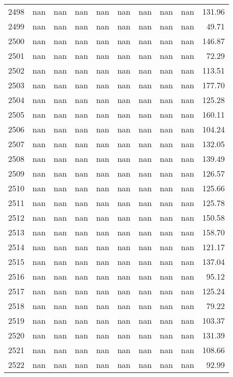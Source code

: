 \begin{tabular}{lrrrrrrrrr}
2498 & nan & nan & nan & nan & nan & nan & nan & nan & 131.96 \\
2499 & nan & nan & nan & nan & nan & nan & nan & nan & 49.71 \\
2500 & nan & nan & nan & nan & nan & nan & nan & nan & 146.87 \\
2501 & nan & nan & nan & nan & nan & nan & nan & nan & 72.29 \\
2502 & nan & nan & nan & nan & nan & nan & nan & nan & 113.51 \\
2503 & nan & nan & nan & nan & nan & nan & nan & nan & 177.70 \\
2504 & nan & nan & nan & nan & nan & nan & nan & nan & 125.28 \\
2505 & nan & nan & nan & nan & nan & nan & nan & nan & 160.11 \\
2506 & nan & nan & nan & nan & nan & nan & nan & nan & 104.24 \\
2507 & nan & nan & nan & nan & nan & nan & nan & nan & 132.05 \\
2508 & nan & nan & nan & nan & nan & nan & nan & nan & 139.49 \\
2509 & nan & nan & nan & nan & nan & nan & nan & nan & 126.57 \\
2510 & nan & nan & nan & nan & nan & nan & nan & nan & 125.66 \\
2511 & nan & nan & nan & nan & nan & nan & nan & nan & 125.78 \\
2512 & nan & nan & nan & nan & nan & nan & nan & nan & 150.58 \\
2513 & nan & nan & nan & nan & nan & nan & nan & nan & 158.70 \\
2514 & nan & nan & nan & nan & nan & nan & nan & nan & 121.17 \\
2515 & nan & nan & nan & nan & nan & nan & nan & nan & 137.04 \\
2516 & nan & nan & nan & nan & nan & nan & nan & nan & 95.12 \\
2517 & nan & nan & nan & nan & nan & nan & nan & nan & 125.24 \\
2518 & nan & nan & nan & nan & nan & nan & nan & nan & 79.22 \\
2519 & nan & nan & nan & nan & nan & nan & nan & nan & 103.37 \\
2520 & nan & nan & nan & nan & nan & nan & nan & nan & 131.39 \\
2521 & nan & nan & nan & nan & nan & nan & nan & nan & 108.66 \\
2522 & nan & nan & nan & nan & nan & nan & nan & nan & 92.99 \\

\end{tabular}
